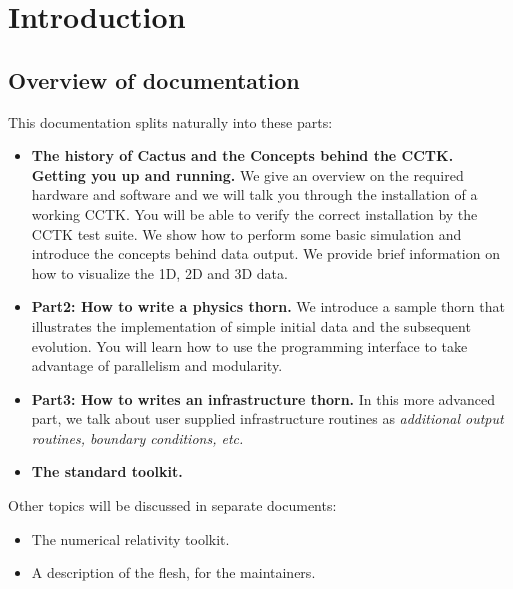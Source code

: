 \part{Introduction}

\chapter{Overview of documentation}

This documentation splits naturally into these parts: 

\begin{itemize}

\item {\bf The history of Cactus and the Concepts behind the
    CCTK. Getting you up and running.}
  We give an overview on the required hardware and
  software and we will talk you through the installation of a working
  CCTK. You will be able to verify the correct installation by the
  CCTK test suite. We show how to perform some basic simulation and
  introduce the concepts behind data output. We provide brief
  information on how to visualize the 1D, 2D and 3D data.

\item {\bf Part2: How to write a physics thorn.} We introduce a
  sample thorn that illustrates the implementation of simple initial
  data and the subsequent evolution. You will learn how to use the
  programming interface to take advantage of parallelism and modularity.

\item {\bf Part3: How to writes an infrastructure thorn.} In this more
  advanced part, we talk about user supplied infrastructure routines
  as {\em additional output routines, boundary conditions, etc.}

\item {\bf The standard toolkit.} 

\end{itemize}

Other topics will be discussed in separate documents:

\begin{itemize}

\item The numerical relativity toolkit.

\item A description of the flesh, for the maintainers.

\end{itemize}

